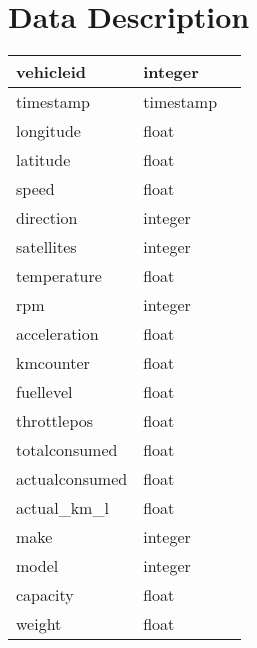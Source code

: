 \section{Data Description}

\begin{tabular}{|l|l|l|}\hline
vehicleid & integer & \\\hline
timestamp & timestamp & \\\hline
longitude & float & \\\hline
latitude & float & \\\hline
speed & float & \\\hline
direction & integer & \\\hline
satellites & integer & \\\hline
temperature & float & \\\hline
rpm & integer & \\\hline
acceleration & float & \\\hline
kmcounter & float & \\\hline
fuellevel& float & \\\hline
throttlepos & float & \\\hline
totalconsumed & float & \\\hline
actualconsumed & float & \\\hline
actual\_km\_l & float & \\\hline
make & integer & \\\hline
model & integer & \\\hline
capacity & float & \\\hline
weight & float & \\\hline
\end{tabular}